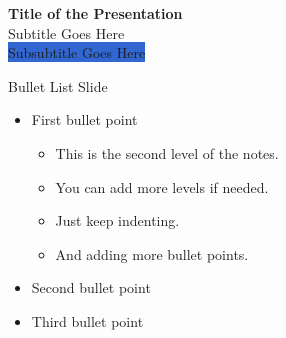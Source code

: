 \documentclass[aspectratio=169, notes]{beamer}
\newcommand{\markhighlight}[1]{\colorbox{highlight}{\textcolor{customtext}{#1}}} %
\begin{document}
{
\ifdefined\titleimage
\fi
\begin{frame}
    \color{white} %
    \begin{center}
        \vspace{2cm}
        \textbf{\Huge Title of the Presentation} \\
        \vspace{1cm}
        {\Large{Subtitle Goes Here}} \\
        \vspace{1cm}
        {\large\markhighlight{Subsubtitle Goes Here}}
    \end{center}
\end{frame}
}

\begin{frame}{Bullet List Slide}
    \begin{itemize}
        \item First bullet point
              \begin{itemize}
                  \item This is the second level of the notes.
                  \item You can add more levels if needed.
                  \item Just keep indenting.
                  \item And adding more bullet points.
              \end{itemize}
        \item Second bullet point
        \item Third bullet point
    \end{itemize}
\end{frame}
\end{document}
